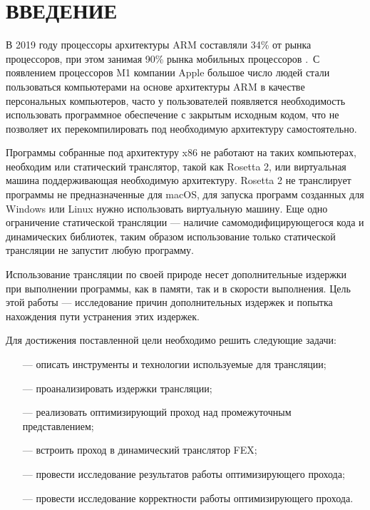\section*{ВВЕДЕНИЕ}

В 2019 году процессоры архитектуры ARM составляли 34\% от рынка процессоров, при этом занимая 90\% рынка мобильных процессоров \cite{arm_report}. С появлением процессоров M1 компании Apple большое число людей стали пользоваться компьютерами на основе архитектуры ARM в качестве персональных компьютеров, часто у пользователей появляется необходимость использовать программное обеспечение с закрытым исходным кодом, что не позволяет их перекомпилировать под необходимую архитектуру самостоятельно.

Программы собранные под архитектуру x86 не работают на таких компьютерах, необходим или статический транслятор, такой как Rosetta 2, или виртуальная машина поддерживающая необходимую архитектуру. Rosetta 2 не транслирует программы не предназначенные для macOS, для запуска программ созданных для Windows или Linux нужно использовать виртуальную машину. Еще одно ограничение статической трансляции --- наличие самомодифицирующегося кода и динамических библиотек, таким образом использование только статической трансляции не запустит любую программу. \cite{fast_bin}

Использование трансляции по своей природе несет дополнительные издержки при выполнении программы, как в памяти, так и в скорости выполнения. Цель этой работы --- исследование причин дополнительных издержек и попытка нахождения пути устранения этих издержек.

Для достижения поставленной цели необходимо решить следующие задачи:

\begin{itemize}[leftmargin=1.6\parindent]
	\item [---] описать инструменты и технологии используемые для трансляции;
	\item [---] проанализировать издержки трансляции;
	\item [---] реализовать оптимизирующий проход над промежуточным представлением;
	\item [---] встроить проход в динамический транслятор FEX;
	\item [---] провести исследование результатов работы оптимизирующего прохода;
	\item [---] провести исследование корректности работы оптимизирующего прохода.
\end{itemize}

\pagebreak